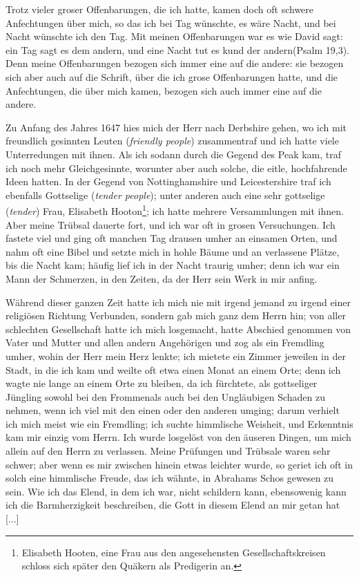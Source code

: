 Trotz vieler groser Offenbarungen, die ich hatte, kamen doch
oft schwere Anfechtungen über mich, so das ich bei Tag wünschte,
es wäre Nacht, und bei Nacht wünschte ich den Tag. Mit meinen
Offenbarungen war es wie David sagt: \glqq ein Tag sagt es dem
andern, und eine Nacht tut es kund der andern\grqq (Psalm 19,3).
Denn meine Offenbarungen bezogen sich immer eine auf die
andere: sie bezogen sich aber auch auf die Schrift, über die ich
grose Offenbarungen hatte, und die Anfechtungen, die über mich
kamen, bezogen sich auch immer eine auf die andere.

Zu Anfang des Jahres 1647 hies mich der Herr nach
Derbshire gehen, wo ich mit freundlich gesinnten Leuten (\textit{friendly
people}) zusammentraf und ich hatte viele Unterredungen mit
ihnen. Als ich sodann durch die Gegend des Peak kam, traf
ich noch mehr Gleichgesinnte, worunter aber auch solche, die eitle,
hochfahrende Ideen hatten. In der Gegend von Nottinghamshire
und Leicestershire traf ich ebenfalls Gottselige (\textit{tender people});
unter anderen auch eine sehr gottselige (\textit{tender}) Frau, Elisabeth
Hooton\footnote{Elisabeth Hooten, eine Frau aus den angesehensten 
Gesellschaftskreisen schloss sich später den Quäkern als Predigerin an.}; 
ich hatte mehrere Versammlungen mit ihnen. Aber
meine Trübsal dauerte fort, und ich war oft in grosen Versuchungen. 
Ich fastete viel und ging oft manchen Tag drausen
umher an einsamen Orten, und nahm oft eine Bibel und setzte
mich in hohle Bäume und an verlassene Plätze, bis die Nacht
kam; häufig lief ich in der Nacht traurig umher; denn ich war
ein Mann der Schmerzen, in den Zeiten, da der Herr sein Werk
in mir anfing.

Während dieser ganzen Zeit hatte ich mich nie mit irgend
jemand zu irgend einer religiösen Richtung Verbunden, sondern
gab mich ganz dem Herrn hin; von aller schlechten Gesellschaft
hatte ich mich losgemacht, hatte Abschied genommen von Vater
und Mutter und allen andern Angehörigen und zog als ein
Fremdling umher, wohin der Herr mein Herz lenkte; ich mietete
ein Zimmer jeweilen in der Stadt, in die ich kam und weilte oft
etwa einen Monat an einem Orte; denn ich wagte nie lange an
einem Orte zu bleiben, da ich fürchtete, als gottseliger Jüngling
sowohl bei den \glqq Frommen\grqq als auch bei den Ungläubigen Schaden
zu nehmen, wenn ich viel mit den einen oder den anderen umging;
darum verhielt ich mich meist wie ein Fremdling; ich suchte himmlische 
Weisheit, und Erkenntnis kam mir einzig vom Herrn. Ich
wurde losgelöst von den äuseren Dingen, um mich allein auf
den Herrn zu verlassen. Meine Prüfungen und Trübsale waren
sehr schwer; aber wenn es mir zwischen hinein etwas leichter
wurde, so geriet ich oft in solch eine himmlische Freude, das ich
wähnte, in Abrahams Schos gewesen zu sein. Wie ich das Elend,
in dem ich war, nicht schildern kann, ebensowenig kann ich die
Barmherzigkeit beschreiben, die Gott in diesem Elend an mir getan
hat [...]

